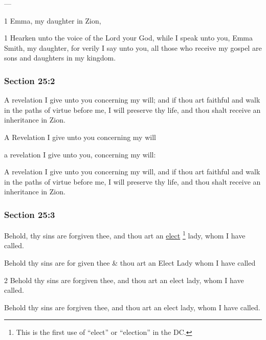 		\begin{framed}
		\scriptsize
			\begin{compactdesc}
				\item[JSP] ---
				\item[BC] 1 Emma, my daughter in Zion,
				\item[DC 1835] 1 Hearken unto the voice of the Lord your God, while I speak unto you, Emma Smith, my daughter, for verily I say unto you, all those who receive my gospel are sons and daughters in my kingdom.
			\end{compactdesc}
		\end{framed}

	\subsubsection{Section 25:2} %
		\label{DC25-2}

		A revelation I give unto you concerning my will; and if thou art faithful and walk in the paths of virtue before me, I will preserve thy life, and thou shalt receive an inheritance in Zion.

		\begin{framed}
		\scriptsize
			\begin{compactdesc}
				\item[JSP] A Revelation I give unto you concerning my will
				\item[BC] a revelation I give unto you, concerning my will: 
				\item[DC 1835] A revelation I give unto you concerning my will, and if thou art faithful and walk in the paths of virtue before me, I will preserve thy life, and thou shalt receive an inheritance in Zion.
			\end{compactdesc}
		\end{framed}

	\subsubsection{Section 25:3} %
		\label{DC25-3}

		Behold, thy sins are forgiven thee, and thou art an \hyperref[ELECTION]{elect}%
			\footnote{%
				This is the first use of ``elect'' or ``election'' in the DC.
				} 
		lady, whom I have called.

		\begin{framed}
		\scriptsize
			\begin{compactdesc}
				\item[JSP] Behold thy sins are for given thee \& thou art an Elect Lady whom I have called
				\item[BC] 2 Behold thy sins are forgiven thee, and thou art an elect lady, whom I have called.
				\item[DC 1835] Behold thy sins are forgiven thee, and thou art an elect lady, whom I have called.
			\end{compactdesc}
		\end{framed}

